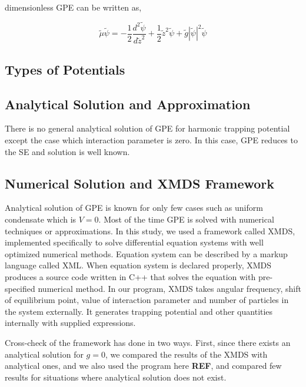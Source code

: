 \documentclass[a4paper,times,12pt]{article}
\begin{document}
dimensionless GPE can be written as,

\begin{equation}
\label{eq:GPE_dimensionless}
\widetilde{\mu} \widetilde{\psi} = -\frac{1}{2}\frac{d^2\widetilde{\psi}}{d\widetilde{z}^2} + \frac{1}{2}\widetilde{z}^2\widetilde{\psi} + \widetilde{g}|\widetilde{\psi}|^2 \widetilde{\psi}
\end{equation}



\subsection{Types of Potentials}


\subsection{Analytical Solution and Approximation}

There is no general analytical solution of GPE for harmonic trapping potential except the case which interaction parameter is zero. In this case, GPE reduces to the SE and solution is well known.


\subsection{Numerical Solution and XMDS Framework}

Analytical solution of GPE is known for only few cases such as uniform condensate which is $V = 0$. Most of the time GPE is solved with numerical techniques or approximations. In this study, we used a framework called XMDS, implemented specifically to solve differential equation systems with well optimized numerical methods. Equation system can be described by a markup language called XML.  When equation system is declared properly, XMDS produces a source code written in C++ that solves the equation with pre-specified numerical method. In our program, XMDS takes angular frequency, shift of equilibrium point, value of interaction parameter and number of particles in the system externally. It generates trapping potential and other quantities internally with supplied expressions.

Cross-check of the framework has done in two ways. First, since there exists an analytical solution for $g = 0$, we compared the results of the XMDS with analytical ones, and we also used the program here \textbf{REF}, and compared few results for situations where analytical solution does not exist.  
\end{document}
